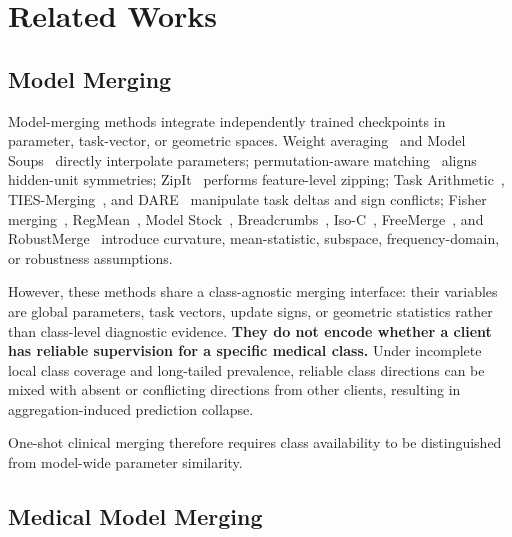 \documentclass[letterpaper]{article} %
\begin{document}
\section{Related Works}

\subsection{Model Merging}

Model-merging methods integrate independently trained checkpoints in parameter, task-vector, or geometric spaces. Weight averaging~\cite{izmailov2018averaging} and Model Soups~\cite{pmlr-v162-wortsman22a} directly interpolate parameters; permutation-aware matching~\cite{entezari2022role,ainsworth2023gitrebasinmergingmodels} aligns hidden-unit symmetries; ZipIt~\cite{stoica2024zipit} performs feature-level zipping; Task Arithmetic~\cite{ilharco2023editingmodelstaskarithmetic}, TIES-Merging~\cite{yadav2023tiesmergingresolvinginterferencemerging}, and DARE~\cite{yu2024languagemodelssupermario} manipulate task deltas and sign conflicts; Fisher merging~\cite{matena_merging_2022}, RegMean~\cite{jin2025datalessknowledgefusionmerging}, Model Stock~\cite{jang2025modelstockneedjust}, Breadcrumbs~\cite{davari2024modelbreadcrumbsscalingmultitask}, Iso-C~\cite{marczak2025taskleftbehindisotropic}, FreeMerge~\cite{zheng2025freemergingfouriertransformefficient}, and RobustMerge~\cite{zeng2025robustmergeparameterefficientmodelmerging} introduce curvature, mean-statistic, subspace, frequency-domain, or robustness assumptions.

However, these methods share a class-agnostic merging interface: their variables are global parameters, task vectors, update signs, or geometric statistics rather than class-level diagnostic evidence. \textbf{They do not encode whether a client has reliable supervision for a specific medical class.} Under incomplete local class coverage and long-tailed prevalence, reliable class directions can be mixed with absent or conflicting directions from other clients, resulting in aggregation-induced prediction collapse\cite{BUDA2018249,10.1371/journal.pmed.1002683}.

One-shot clinical merging therefore requires class availability to be distinguished from model-wide parameter similarity.

\subsection{Medical Model Merging}
\end{document}
